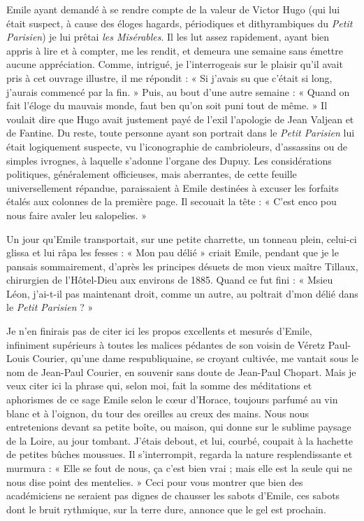 \documentclass[french,twoside]{book} %
\begin{document}
Emile ayant demandé à se rendre compte de la valeur de Victor Hugo (qui lui était suspect, à cause des éloges hagards, périodiques et dithyrambiques du {\itshape Petit Parisien}) je lui prêtai {\itshape les Misérables}. Il les lut assez rapidement, ayant bien appris à lire et à compter, me les rendit, et demeura une semaine sans émettre aucune appréciation. Comme, intrigué, je l’interrogeais sur le plaisir qu’il avait pris à cet ouvrage illustre, il me répondit : « Si j’avais su que c’était si long, j’aurais commencé par la fin. » Puis, au bout d’une autre semaine : « Quand on fait l’éloge du mauvais monde, faut ben qu’on soit puni tout de même. » Il voulait dire que Hugo avait justement payé de l’exil l’apologie de Jean Valjean et de Fantine. Du reste, toute personne ayant son portrait dans le {\itshape Petit Parisien} lui était logiquement suspecte, vu l’iconographie de cambrioleurs, d’assassins ou de simples ivrognes, à laquelle s’adonne l’organe des Dupuy. Les considérations politiques, généralement officieuses, mais aberrantes, de cette feuille universellement répandue, paraissaient à Emile destinées à excuser les forfaits étalés aux colonnes de la première page. Il secouait la tête : « C’est enco pou nous faire avaler leu salopelies. »\par
Un jour qu’Emile transportait, sur une petite charrette, un tonneau plein, celui-ci glissa et lui râpa les fesses : « Mon pau délié » criait Emile, pendant que je le pansais sommairement, d’après les principes désuets de mon vieux maître Tillaux, chirurgien de l’Hôtel-Dieu aux environs de 1885. Quand ce fut fini : « Msieu Léon, j’ai-t-il pas maintenant droit, comme un autre, au poltrait d’mon délié dans le {\itshape Petit Parisien} ? »\par
Je n’en finirais pas de citer ici les propos excellents et mesurés d’Emile, infiniment supérieurs à toutes les malices pédantes de son voisin de Véretz Paul-Louis Courier, qu’une dame respubliquaine, se croyant cultivée, me vantait sous le nom de Jean-Paul Courier, en souvenir sans doute de Jean-Paul Chopart. Mais je veux citer ici la phrase qui, selon moi, fait la somme des méditations et aphorismes de ce sage Emile selon le cœur d’Horace, toujours parfumé au vin blanc et à l’oignon, du tour des oreilles au creux des mains. Nous nous entretenions devant sa petite boîte, ou maison, qui donne sur le sublime paysage de la Loire, au jour tombant. J’étais debout, et lui, courbé, coupait à la hachette de petites bûches moussues. Il s’interrompit, regarda la nature resplendissante et murmura : « Elle se fout de nous, ça c’est bien vrai ; mais elle est la seule qui ne nous dise point des mentelies. » Ceci pour vous montrer que bien des académiciens ne seraient pas dignes de chausser les sabots d’Emile, ces sabots dont le bruit rythmique, sur la terre dure, annonce que le gel est prochain.\par
\end{document}
